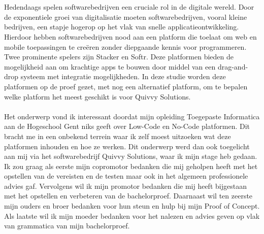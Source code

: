 
\chapter*{}%
\label{ch:voorwoord}

Hedendaags spelen softwarebedrijven een cruciale rol in de digitale wereld. 
Door de exponentiele groei van digitalisatie moeten softwarebedrijven, vooral kleine bedrijven, 
een stapje hogerop op het vlak van snelle applicatieontwikkeling. Hierdoor hebben softwarebedrijven nood aan 
een platform die toelaat om web en mobile toepassingen te creëren zonder diepgaande kennis voor programmeren. 
Twee prominente spelers zijn Stacker en Softr. Deze platformen bieden de mogelijkheid aan om krachtige apps te bouwen 
door middel van een drag-and-drop systeem met integratie mogelijkheden. In deze studie worden deze platformen op de proef gezet, 
met nog een alternatief platform, om te bepalen welke platform het meest geschikt is voor Quivvy Solutions.
\\
\\
Het onderwerp vond ik interessant doordat mijn opleiding Toegepaste Informatica aan de Hogeschool Gent niks geeft over Low-Code en No-Code platformen.
Dit bracht me in een onbekend terrein waar ik zelf moest uitzoeken wat deze platformen inhouden en hoe ze werken. Dit onderwerp werd dan ook toegelicht aan mij via 
het softwarebedrijf Quivvy Solutions, waar ik mijn stage heb gedaan.
\\
Ik zou graag als eerste mijn copromotor bedanken die mij geholpen heeft met het opstellen van de vereisten en de testen maar ook
in het algemeen professionele advies gaf. Vervolgens wil ik mijn promotor bedanken die mij heeft bijgestaan met het opstellen en verbeteren van de bachelorproef. Daarnaast 
wil ten zeerste mijn ouders en broer bedanken voor hun steun en hulp bij mijn Proof of Concept. Als laatste wil ik mijn moeder bedanken voor het nalezen en advies geven op vlak van grammatica van mijn bachelorproef.
